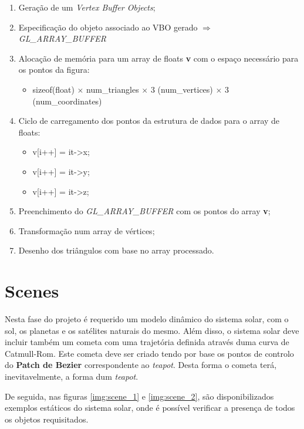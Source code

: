 \documentclass[a4paper]{article}
\begin{document}
\ttfamily
\begin{enumerate}
  \item Geração de um \textit{Vertex Buffer Objects};
  \item Especificação do objeto associado ao VBO gerado $\Rightarrow$ \textit{GL\_ARRAY\_BUFFER}
  \item Alocação de memória para um array de floats \textbf{v} com o espaço necessário para os pontos da figura:
    \begin{itemize}
      \item sizeof(float) $\times$ num\_triangles $\times$ 3 (num\_vertices) $\times$ 3 (num\_coordinates)
    \end{itemize}
  \item Ciclo de carregamento dos pontos da estrutura de dados para o array de floats:
    \begin{itemize}
      \item v[i++] = it->x;
      \item v[i++] = it->y;
      \item v[i++] = it->z;
    \end{itemize}
  \item Preenchimento do \textit{GL\_ARRAY\_BUFFER} com os pontos do array \textbf{v};
  \item Transformação num array de vértices;
  \item Desenho dos triângulos com base no array processado.
\end{enumerate}
\rmfamily


\newpage

\section{Scenes}
\label{sec:scenes}

Nesta fase do projeto é requerido um modelo dinâmico do sistema solar, com o sol, os planetas e os satélites naturais do mesmo. Além disso, o sistema solar deve incluir também um cometa com uma trajetória definida através duma curva de Catmull-Rom. Este cometa deve ser criado tendo por base os pontos de controlo do \textbf{Patch de Bezier} correspondente ao \textit{teapot}. Desta forma o cometa terá, inevitavelmente, a forma dum \textit{teapot}.

De seguida, nas figuras \ref{img:scene_1} e \ref{img:scene_2}, são disponibilizados exemplos estáticos do sistema solar, onde é possível verificar a presença de todos os objetos requisitados.
\end{document}

